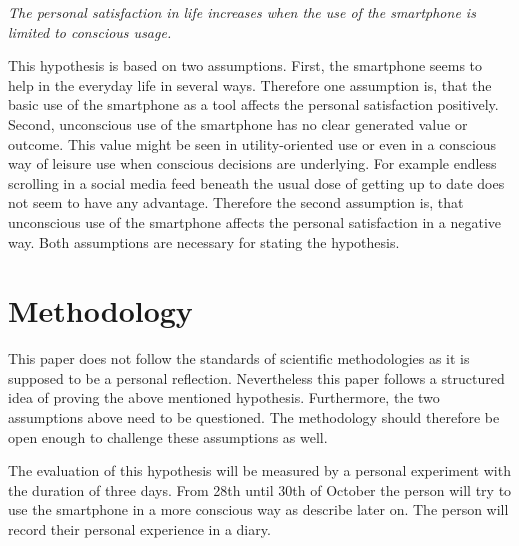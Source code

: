 \documentclass[11pt,letterpaper]{article}
\begin{document}
\begin{center}
\textit{The personal satisfaction in life increases when the use of the smartphone is limited to conscious usage.}
 \end{center}

This hypothesis is based on two assumptions. First, the smartphone seems to help in the everyday life in several ways. Therefore one assumption is, that the basic use of the smartphone as a tool affects the personal satisfaction positively. Second, unconscious use of the smartphone has no clear generated value or outcome. This value might be seen in utility-oriented use or even in a conscious way of leisure use when conscious decisions are underlying. For example endless scrolling in a social media feed beneath the usual dose of getting up to date does not seem to have any advantage. Therefore the second assumption is, that unconscious use of the smartphone affects the personal satisfaction in a negative way. Both assumptions are necessary for stating the hypothesis. 

\section*{Methodology}
This paper does not follow the standards of scientific methodologies as it is supposed to be a personal reflection. Nevertheless this paper follows a structured idea of proving the above mentioned hypothesis. Furthermore, the two assumptions above need to be questioned. The methodology should therefore be open enough to challenge these assumptions as well. 

The evaluation of this hypothesis will be measured by a personal experiment with the duration of three days. From 28th until 30th of October the person will try to use the smartphone in a more conscious way as describe later on. The person will record their personal experience in a diary. 
\end{document}
